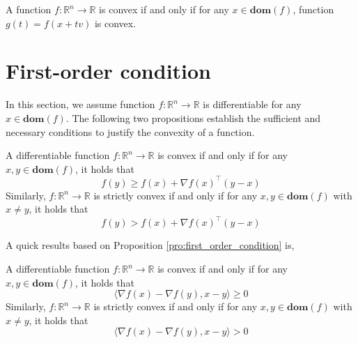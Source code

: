 \begin{proposition}
A function $f:\mathbb R^n\rightarrow \mathbb R$ is convex if and only if for any $x\in \textbf{dom}(f)$, function
$g(t)=f(x+tv)$ is convex.
\end{proposition}

\section{First-order condition}
In this section, we assume function $f: \mathbb R^n\rightarrow \mathbb R$
is differentiable for any $x\in \textbf{dom}(f)$. 
The following two propositions establish the sufficient and necessary conditions
to justify the convexity of a function.

\begin{proposition}
\label{pro:first_order_condition}
 A differentiable function $f:\mathbb R^n\rightarrow \mathbb R$ is convex if and only if for any $x, y\in \textbf{dom}(f)$, it holds that
\begin{equation}
f(y) \geq f(x)+\nabla f(x)^\top (y-x)
\end{equation}
Similarly, $f:\mathbb R^n\rightarrow \mathbb R$ is strictly convex if and only if for any $x, y\in \textbf{dom}(f)$ with $x\neq y$, it holds that
\begin{equation}
f(y) > f(x)+\nabla f(x)^\top (y-x)
\end{equation}
\end{proposition}

A quick results based on Proposition \ref{pro:first_order_condition} is, 
\begin{proposition}
 A differentiable function $f:\mathbb R^n\rightarrow \mathbb R$ is convex if and only if for any $x, y\in \textbf{dom}(f)$, it holds that
\begin{equation}
\langle \nabla f(x)-\nabla f(y), x-y\rangle \geq 0
\end{equation}
Similarly, $f:\mathbb R^n\rightarrow \mathbb R$ is strictly convex if and only if for any $x, y\in \textbf{dom}(f)$ with $x\neq y$, it holds that
\begin{equation}
\langle \nabla f(x)-\nabla f(y), x-y\rangle >0
\end{equation}
\end{proposition}


